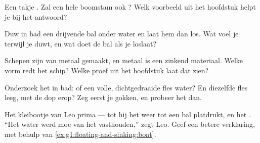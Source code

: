 \begin{exercise}[$\star$]\label{exo:g1:floating-and-sinking:5}
Een takje . Zal een hele boomstam ook ? Welk voorbeeld
uit het hoofdstuk helpt je bij het antwoord?
\end{exercise}

\begin{exercise}[$\star$]\label{exo:g1:floating-and-sinking:6}
Duw in bad een drijvende bal onder water en laat hem dan los. Wat voel
je terwijl je duwt, en wat doet de bal als je loslaat?
\end{exercise}

\begin{exercise}[$\star$]\label{exo:g1:floating-and-sinking:7}
Schepen zijn van metaal gemaakt, en metaal is een zinkend materiaal.
Welke vorm redt het schip? Welke proef uit het hoofdstuk laat dat
zien?
\end{exercise}

\begin{exercise}[$\star$]\label{exo:g1:floating-and-sinking:8}
Onderzoek het in bad:  of  een volle, dichtgedraaide fles
water? En diezelfde fles leeg, met de dop erop? Zeg eerst je gokken,
en probeer het dan.
\end{exercise}

\begin{exercise}[$\star\star$]\label{exo:g1:floating-and-sinking:9}
Het kleibootje van Leo  prima --- tot hij het weer tot een bal
platdrukt, en het . ``Het water werd moe van het vasthouden,''
zegt Leo. Geef een betere verklaring, met behulp van
\cref{ex:g1:floating-and-sinking:boat}.
\end{exercise}
